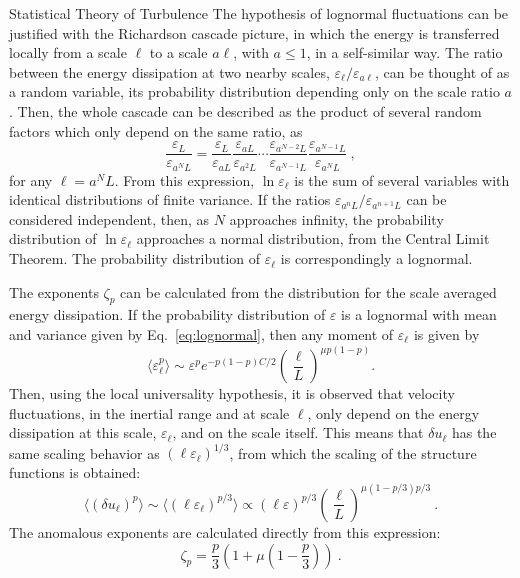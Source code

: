 \begin{chapter}{Statistical Theory of Turbulence}
The hypothesis of lognormal fluctuations can be justified with the
Richardson cascade picture, in which the energy is transferred locally from a scale $\ell$ to a scale $a \ell$, with $a \leq 1$, in a self-similar way. The ratio between the energy dissipation at two nearby scales, $\varepsilon_{\ell} / \varepsilon_{a \ell}$, can be thought of as a random variable, its probability distribution depending only on the scale ratio $a$. Then, the whole cascade can be described as the product of several random factors which only depend on the same ratio, as
\begin{equation} \label{eq:epsilon-cascade}
    \frac{\varepsilon_L}{\varepsilon_{a^N L}} =
    \frac{\varepsilon_L}{\varepsilon_{a L}} \frac{\varepsilon_{a L}}{\varepsilon_{a^2 L}} \cdots
    \frac{\varepsilon_{a^{N-2} L}}{\varepsilon_{a^{N-1} L}}
    \frac{\varepsilon_{a^{N-1} L}}{\varepsilon_{a^N L}} \ ,
\end{equation}
for any $\ell = a^N L$. From this expression, $\ln \varepsilon_{\ell}$ is
the sum of several variables with identical distributions
of finite variance. If the
ratios $\varepsilon_{a^n L} / \varepsilon_{a^{n+1} L}$ can be considered
independent, then, as $N$ approaches infinity, the probability distribution of
$\ln \varepsilon_{\ell}$ approaches a normal distribution,
from the Central Limit Theorem. The probability distribution of
$\varepsilon_{\ell}$ is correspondingly a lognormal.

The exponents $\zeta_p$ can be calculated from
the distribution for the scale averaged energy dissipation.
If the probability distribution of $\varepsilon$ is a lognormal
with mean and variance given by Eq.~\eqref{eq:lognormal},
then any moment of $\varepsilon_{\ell}$ is given
by
\begin{equation}
    \langle \varepsilon_{\ell}^{p} \rangle \sim \varepsilon^{p} e^{-p(1-p) C/2}\left(\frac{\ell}{L}\right)^{\mu p(1-p)}.
\end{equation}
Then, using the local universality hypothesis, it is observed that
velocity fluctuations, in the inertial range and
at scale $\ell$, only depend on the energy dissipation at this scale, $\varepsilon_{\ell}$,
and on the scale itself. This means that $\delta u_{\ell}$ has
the same scaling behavior as $(\ell \varepsilon_{\ell})^{1/3}$,
from which the scaling of the structure functions is obtained:
\begin{equation}
    \langle \left(\delta u_{\ell}\right)^{p} \rangle \sim
    \langle \left(\ell \varepsilon_{\ell}\right)^{p / 3} \rangle
    \propto
    (\ell \varepsilon)^{p / 3}\left(\frac{\ell}{L}\right)^{\mu (1-p/3) p/3} \ .
\end{equation}
The anomalous exponents are calculated directly from this expression:
\begin{equation} \label{eq:zeta}
    \zeta_p = \frac{p}{3} \left( 1 + \mu \left( 1-\frac{p}{3} \right) \right) \ .
\end{equation}


\end{chapter}
